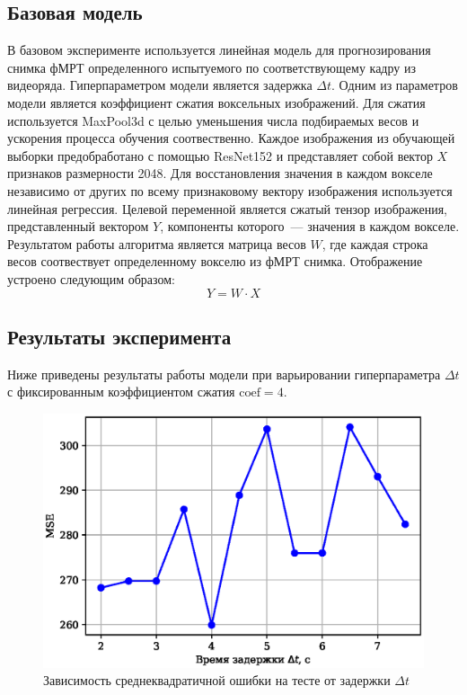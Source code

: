 \documentclass[12pt,twoside]{article}
\begin{document}
\subsection{Базовая модель}
В базовом эксперименте используется линейная модель для прогнозирования снимка фМРТ определенного испытуемого по соответствующему кадру из видеоряда. 
Гиперпараметром модели является задержка $\Delta t$.
Одним из параметров модели является коэффициент сжатия воксельных изображений. 
Для сжатия используется MaxPool3d с целью уменьшения числа подбираемых весов и ускорения процесса обучения соотвественно.
Каждое изображения из обучающей выборки предобработано с помощью ResNet152 и представляет собой вектор $X$ признаков размерности 2048. 
Для восстановления значения в каждом вокселе независимо от других по всему признаковому вектору изображения используется линейная регрессия. 
Целевой переменной является сжатый тензор изображения, представленный вектором $Y$, компоненты которого~--- значения в каждом вокселе.
Результатом работы алгоритма является матрица весов $W$, где каждая строка весов соотвествует определенному вокселю из фМРТ снимка.
Отображение устроено следующим образом:
\begin{equation}
    Y = W \cdot X
\end{equation}
\subsection{Результаты эксперимента}
Ниже приведены результаты работы модели при варьировании гиперпараметра $\Delta t$ с фиксированным коэффициентом сжатия $\mathrm{coef} = 4$. 
\begin{figure}[h!]
    \centering
    \includegraphics[scale = 0.8]{MSE_dt.eps}
    \caption{Зависимость среднеквадратичной ошибки на тесте от задержки ${\Delta t}$}
    \label{MSE_dt}
\end{figure}
\end{document}
